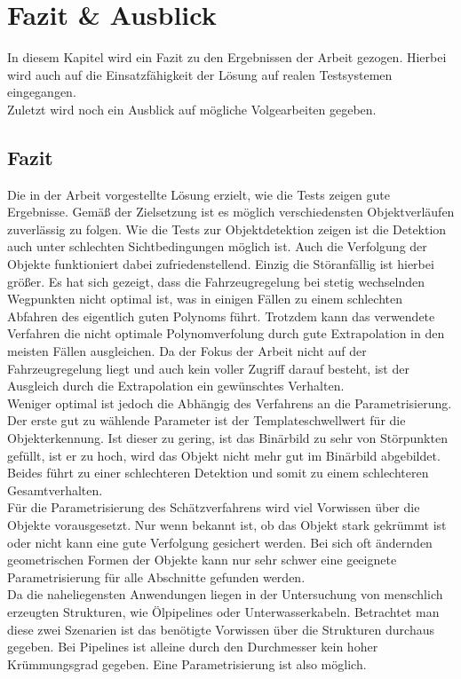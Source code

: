 \section{Fazit \& Ausblick}
In diesem Kapitel wird ein Fazit zu den Ergebnissen der Arbeit gezogen. Hierbei wird auch auf die Einsatzfähigkeit der Lösung auf realen Testsystemen eingegangen.\\
Zuletzt wird noch ein Ausblick auf mögliche Volgearbeiten gegeben.
\subsection{Fazit}
Die in der Arbeit vorgestellte Lösung erzielt, wie die Tests zeigen gute Ergebnisse. Gemäß der Zielsetzung ist es möglich verschiedensten Objektverläufen zuverlässig zu folgen. Wie die Tests zur Objektdetektion zeigen ist die Detektion auch unter schlechten Sichtbedingungen möglich ist. Auch die Verfolgung der Objekte funktioniert dabei zufriedenstellend. Einzig die Störanfällig ist hierbei größer. Es hat sich gezeigt, dass die Fahrzeugregelung bei stetig wechselnden Wegpunkten nicht optimal ist, was in einigen Fällen zu einem schlechten Abfahren des eigentlich guten Polynoms führt. Trotzdem kann das verwendete Verfahren die nicht optimale Polynomverfolung durch gute Extrapolation in den meisten Fällen ausgleichen. Da der Fokus der Arbeit nicht auf der Fahrzeugregelung liegt und auch kein voller Zugriff darauf besteht, ist der Ausgleich durch die Extrapolation ein gewünschtes Verhalten.\\
Weniger optimal ist jedoch die Abhängig des Verfahrens an die Parametrisierung. Der erste gut zu wählende Parameter ist der Templateschwellwert für die Objekterkennung. Ist dieser zu gering, ist das Binärbild zu sehr von Störpunkten gefüllt, ist er zu hoch, wird das Objekt nicht mehr gut im Binärbild abgebildet. Beides führt zu einer schlechteren Detektion und somit zu einem schlechteren Gesamtverhalten.\\
Für die Parametrisierung des Schätzverfahrens wird viel Vorwissen über die Objekte vorausgesetzt. Nur wenn bekannt ist, ob das Objekt stark gekrümmt ist oder nicht kann eine gute Verfolgung gesichert werden. Bei sich oft ändernden geometrischen Formen der Objekte kann nur sehr schwer eine geeignete Parametrisierung für alle Abschnitte gefunden werden.\\
Da die naheliegensten Anwendungen liegen in der Untersuchung von menschlich erzeugten Strukturen, wie Ölpipelines oder Unterwasserkabeln. Betrachtet man diese zwei Szenarien ist das benötigte Vorwissen über die Strukturen durchaus gegeben. Bei Pipelines ist alleine durch den Durchmesser kein hoher Krümmungsgrad gegeben. Eine Parametrisierung ist also möglich.

